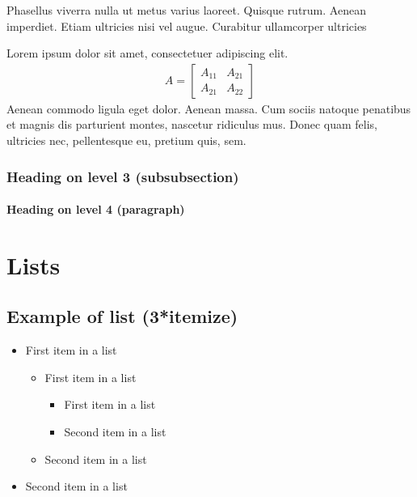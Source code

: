 \documentclass[paper=a4, fontsize=11pt]{scrartcl} %
\numberwithin{equation}{section} %
\numberwithin{figure}{section} %
\numberwithin{table}{section} %
\begin{document}
Phasellus viverra nulla ut metus varius laoreet. Quisque rutrum. Aenean imperdiet. Etiam ultricies nisi vel augue. Curabitur ullamcorper ultricies



Lorem ipsum dolor sit amet, consectetuer adipiscing elit. 
\begin{align}
A = 
\begin{bmatrix}
A_{11} & A_{21} \\
A_{21} & A_{22}
\end{bmatrix}
\end{align}
Aenean commodo ligula eget dolor. Aenean massa. Cum sociis natoque penatibus et magnis dis parturient montes, nascetur ridiculus mus. Donec quam felis, ultricies nec, pellentesque eu, pretium quis, sem.


\subsubsection{Heading on level 3 (subsubsection)}

\lipsum[3] %

\paragraph{Heading on level 4 (paragraph)}

\lipsum[6] %


\section{Lists}


\subsection{Example of list (3*itemize)}
\begin{itemize}
	\item First item in a list 
		\begin{itemize}
		\item First item in a list 
			\begin{itemize}
			\item First item in a list 
			\item Second item in a list 
			\end{itemize}
		\item Second item in a list 
		\end{itemize}
	\item Second item in a list 
\end{itemize}
\end{document}
